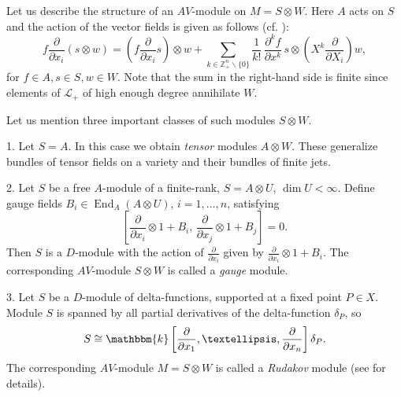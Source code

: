 \documentclass[12pt]{amsart}
\renewcommand{\k}{{\mathbbm{k}}}
\renewcommand{\L}{{\mathcal{L}}}
\newcommand{\Z}{{\mathbb{Z}}}
\newcommand{\End}{{\operatorname{End}}}
\theoremstyle{definition}
\begin{document}
Let us describe the structure of an $AV$-module on $M = S \otimes W$. Here $A$ acts on $S$ and the action of the vector fields is given as follows (cf. \cite{BilligFutornyNilsson}):
\[
f \frac{\partial}{\partial x_i} (s \otimes w) = \left( f \frac{\partial}{\partial x_i} s \right) \otimes w + \sum_{k \in \Z_{+}^n \backslash \{ 0 \}} \frac{1}{k!} \,\frac{\partial^k f}{\partial x^k}\, s \otimes \left( X^k \frac{\partial}{\partial X_i}\right) w,
\]
for $f \in A, s\in S, w \in W$. Note that the sum in the right-hand side is finite since elements of $\L_+$ of high enough degree annihilate $W$.

Let us mention three important classes of such modules $S \otimes W$.

1. Let $S = A$. In this case we obtain {\it tensor} modules $A \otimes W$. These generalize bundles of tensor fields on a variety and their bundles of finite jets.

2. Let $S$ be a free $A$-module of a finite-rank, $S = A \otimes U$, $\dim U < \infty$. Define gauge fields $B_i \in \End_A (A \otimes U)$, $i = 1, \dots, n$, satisfying 
\[
\left[ \frac{\partial}{\partial x_i} \otimes 1 + B_i, \, \frac{\partial}{\partial x_j} \otimes 1 + B_j \right] = 0.
\]
Then $S$ is a $D$-module with the action of $\frac{\partial}{\partial x_i}$
given by $\frac{\partial}{\partial x_i} \otimes 1 + B_i$.
The corresponding $AV$-module $S \otimes W$ is called a {\it gauge} module.

3. Let $S$ be a $D$-module of delta-functions, supported at a fixed point $P \in X$. Module $S$ is spanned by all partial derivatives of the delta-function $\delta_P$, so 
\[
S \cong \k \left[ \frac{\partial}{\partial x_1}, \ldots, \frac{\partial}{\partial x_n} \right] \delta_P .
\]
The corresponding $AV$-module $M = S \otimes W$ is called a {\it Rudakov} module (see \cite{BilligFutornyNilsson, BilligBouaziz} for details).
\end{document}
